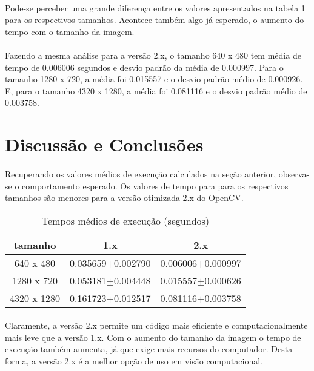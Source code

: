 \documentclass{article}
\begin{document}
	\paragraph{}
	Pode-se perceber uma grande diferença entre os valores apresentados na tabela 1 para os respectivos tamanhos. Acontece também algo já esperado, o aumento do tempo com o tamanho da imagem.
	\paragraph{}
	Fazendo a mesma análise para a versão 2.x, o tamanho 640 x 480 tem média de tempo de 0.006006 segundos e desvio padrão da média de 0.000997. Para o tamanho 1280 x 720, a média foi 0.015557 e o desvio padrão médio de 0.000926. E, para o tamanho 4320 x 1280, a média foi 0.081116 e o desvio padrão médio de 0.003758.

	\section{Discussão e Conclusões} %
	\label{sec:discussao_e_conclusoes}
	\paragraph{} %
	\label{par:}
	Recuperando os valores médios de execução calculados na seção anterior, observa-se o comportamento esperado. Os valores de tempo para para os respectivos tamanhos são menores para a versão otimizada 2.x do OpenCV.
	\begin{table}[ht]
		\caption{Tempos médios de execução (segundos)}
		\centering
		\begin{tabular}{c c c}
			\hline\hline
			tamanho & 1.x & 2.x\\
			\hline
			640 x 480 & 0.035659$\pm$0.002790 & 0.006006$\pm$0.000997\\
			1280 x 720 & 0.053181$\pm$0.004448 & 0.015557$\pm$0.000626\\
			4320 x 1280 & 0.161723$\pm$0.012517 & 0.081116$\pm$0.003758\\
			\hline
		\end{tabular}
	\end{table}
	\paragraph{}
	Claramente, a versão 2.x permite um código mais eficiente e computacionalmente mais leve que a versão 1.x. Com o aumento do tamanho da imagem o tempo de execução também aumenta, já que exige mais recursos do computador. Desta forma, a versão 2.x é a melhor opção de uso em visão computacional.
\end{document}
